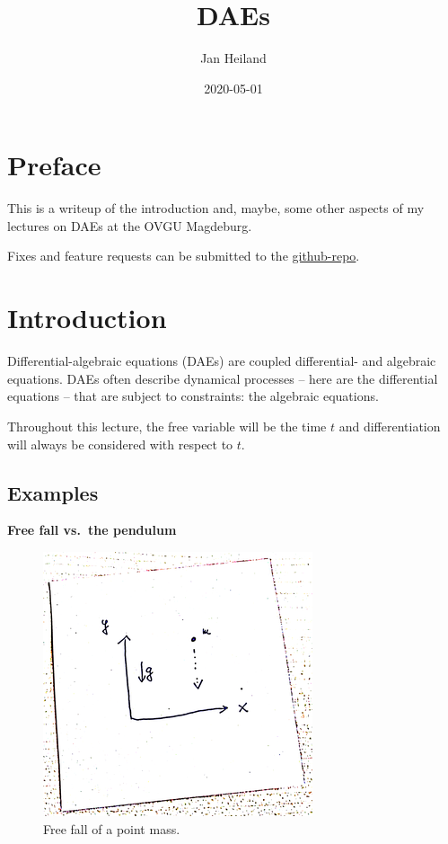\documentclass[]{book}
\title{DAEs}
\author{Jan Heiland}
\institute{OVGU/MPI}
\date{2020-05-01}
\theoremstyle{definition}
\theoremstyle{definition}
\theoremstyle{definition}
\theoremstyle{remark}
\begin{document}
\maketitle

{
\setcounter{tocdepth}{1}
\tableofcontents
}
\chapter*{Preface}\label{preface}

This is a writeup of the introduction and, maybe, some other aspects of
my lectures on DAEs at the OVGU Magdeburg.

Fixes and feature requests can be submitted to the
\href{https://github.com/highlando/script-daes}{github-repo}.

\newcommand{\ind}{\operatorname{ind}}

\chapter{Introduction}\label{introduction}

Differential-algebraic equations (DAEs) are coupled differential- and
algebraic equations. DAEs often describe dynamical processes -- here are
the differential equations -- that are subject to constraints: the
algebraic equations.

Throughout this lecture, the free variable will be the time \(t\) and
differentiation will always be considered with respect to \(t\).

\section{Examples}\label{examples}

\textbf{Free fall vs.~the pendulum}

\begin{figure}

{\centering \includegraphics[width=0.4\linewidth]{pics/freefall} 

}

\caption{Free fall of a point mass.}\label{fig:free-fall}
\end{figure}
\end{document}
